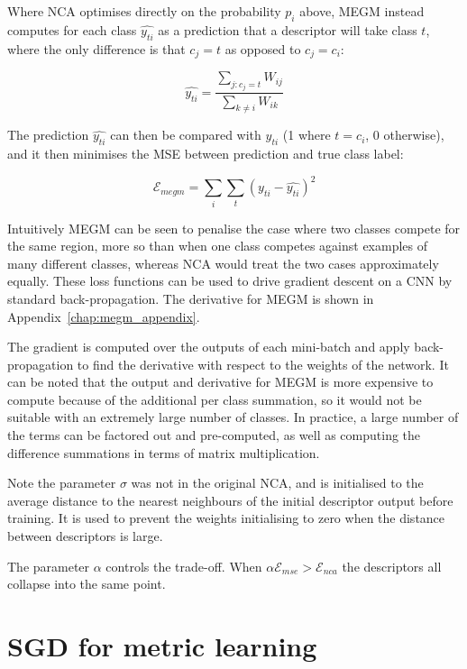 Where \gls{NCA} optimises directly on the probability $ p_{i} $ above, \gls{MEGM} instead computes for each class $ \hat{y_{ti}} $ as a prediction that a descriptor will take class $ t $, where the only difference is that $ c_j = t $ as opposed to $ c_j = c_i $:

\begin{equation}
\label{eq:megm_pred}
\hat{y_{ti}} = \frac{\sum_{j:c_j = t}W_{ij}}{\sum_{k \neq i}{W_{ik}}}
\end{equation}

The prediction $ \hat{y_{ti}} $ can then be compared with $ y_{ti} $ (1 where $ t = c_i $, 0 otherwise), and it then minimises the \gls{MSE} between prediction and true class label:

\begin{equation}
\label{eq:megm_loss}
\mathcal{E}_{megm} =  \sum_i\sum_t{(y_{ti} - \hat{y_{ti}})^2}
\end{equation}

Intuitively \gls{MEGM} can be seen to penalise the case where two classes compete for the same region,  more so than when one class competes against examples of many different classes, whereas \gls{NCA} would treat the two cases approximately equally. These loss functions can be used to drive gradient descent on a \gls{CNN} by standard back-propagation. The derivative for \gls{MEGM} is shown in Appendix~\ref{chap:megm_appendix}.

The gradient is computed over the outputs of each mini-batch and apply back-propagation to find the derivative with respect to the weights of the network. It can be noted that the output and derivative for \gls{MEGM} is more expensive to compute because of the additional per class summation, so it would not be suitable with an extremely large number of classes. In practice, a large number of the terms can be factored out and pre-computed, as well as computing the difference summations in terms of matrix multiplication.

Note the parameter $ \sigma $ was not in the original \gls{NCA}, and is initialised to the average distance to the nearest neighbours of the initial descriptor output before training. It is used to prevent the weights initialising to zero when the distance between descriptors is large.


The parameter $\alpha $ controls the trade-off. When $ \alpha \mathcal{E}_{mse} > \mathcal{E}_{nca} $ the descriptors all collapse into the same point.


\section{SGD for metric learning}


